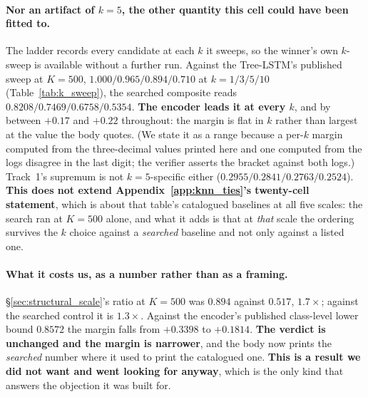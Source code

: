 \paragraph{Nor an artifact of $k{=}5$, the other quantity this cell could have been fitted to.} The ladder records every candidate at each $k$ it sweeps, so the winner's own $k$-sweep is available without a further run. Against the Tree-LSTM's published sweep at $K{=}500$, $1.000/0.965/0.894/0.710$ at $k{=}1/3/5/10$ (Table~\ref{tab:k_sweep}), the searched composite reads $0.8208/0.7469/0.6758/0.5354$. \textbf{The encoder leads it at every $k$}, and by between $+0.17$ and $+0.22$ throughout: the margin is flat in $k$ rather than largest at the value the body quotes. (We state it as a range because a per-$k$ margin computed from the three-decimal values printed here and one computed from the logs disagree in the last digit; the verifier asserts the bracket against both logs.) Track~1's supremum is not $k{=}5$-specific either ($0.2955/0.2841/0.2763/0.2524$). \textbf{This does not extend Appendix~\ref{app:knn_ties}'s twenty-cell statement}, which is about that table's catalogued baselines at all five scales: the search ran at $K{=}500$ alone, and what it adds is that at \emph{that} scale the ordering survives the $k$ choice against a \emph{searched} baseline and not only against a listed one.

\paragraph{What it costs us, as a number rather than as a framing.} \S\ref{sec:structural_scale}'s ratio at $K{=}500$ was $0.894$ against $0.517$, $1.7\times$; against the searched control it is $1.3\times$. Against the encoder's published class-level lower bound $0.8572$ the margin falls from $+0.3398$ to $\mathbf{+0.1814}$. \textbf{The verdict is unchanged and the margin is narrower}, and the body now prints the \emph{searched} number where it used to print the catalogued one. \textbf{This is a result we did not want and went looking for anyway}, which is the only kind that answers the objection it was built for.

